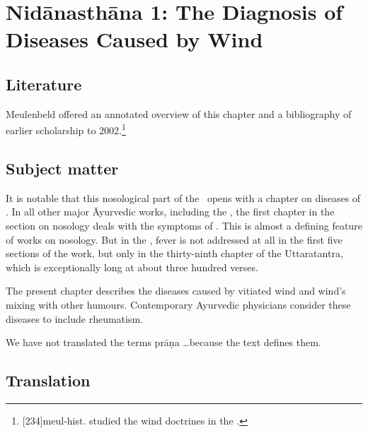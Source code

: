 
\chapter{Nidānasthāna 1: The Diagnosis of Diseases Caused by Wind}


\section{Literature}

Meulenbeld offered an annotated overview of this chapter and a
bibliography of earlier scholarship to 
2002.\footnote{[234]{meul-hist}. \citep{rube-1954b} studied the 
wind doctrines in the \CS.}


\section{Subject matter}

It is notable that this nosological part of the \SS\ opens with a
chapter on diseases of .  In all other major
Āyurvedic works, including the \CS, the first chapter in the section
on nosology deals with the symptoms of .  This is almost a 
defining feature of works on nosology.  But in the \SS, fever is not addressed at all 
in the first five sections of the work, but only in the thirty-ninth chapter of the 
Uttaratantra, which is exceptionally long at about three hundred verses.

The present chapter describes the diseases caused by vitiated wind and
wind's mixing with other humours. Contemporary Ayurvedic physicians 
consider these diseases to include rheumatism. 

We have not translated the terms prāṇa \ldots because the text defines 
them.

\section{Translation}

